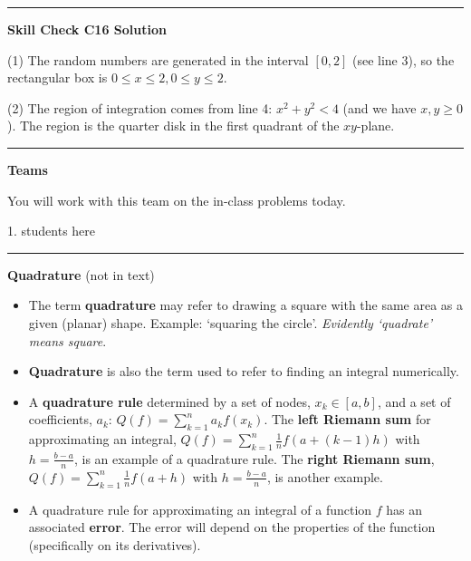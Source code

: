 \documentclass[12pt,letterpaper,noanswers]{exam}
\begin{document}
\vspace{0.2cm}
\hrule
\vspace{0.2cm}

\noindent\textbf{Skill Check C16 Solution}

(1) The random numbers are generated in the interval $[0,2]$ (see line 3), so the rectangular box is $0\leq x \leq 2, 0\leq y \leq 2$.

(2) The region of integration comes from line 4: $x^2+y^2 < 4$ (and we have $x,y\geq 0$).  The region is the quarter disk in the first quadrant of the $xy$-plane.

\vspace{0.2cm}
\hrule
\vspace{0.2cm}

\noindent\textbf{Teams}

You will work with this team on the in-class problems today.
\begin{multicols}{2}
1.  students here

\end{multicols}

\hrule
\vspace{0.2cm}





\noindent\textbf{Quadrature} (not in text)
\begin{tcolorbox}
\begin{itemize}
\itemsep0em
    \item The term \textbf{quadrature} may refer to drawing a square with the same area as a given (planar) shape.  Example: `squaring the circle'.  \emph{Evidently `quadrate' means square}.
    \item \textbf{Quadrature} is also the term used to refer to finding an integral numerically.
    \item A \textbf{quadrature rule} determined by a set of nodes, $x_k \in [a,b]$, and a set of coefficients, $a_k$: $\displaystyle Q(f) = \sum\limits_{k=1}^n a_k f(x_k)$.  The \textbf{left Riemann sum} for approximating an integral, $\displaystyle Q(f) = \sum\limits_{k=1}^n \frac{1}{n}f(a + (k-1)h)$ with $h = \frac{b-a}{n}$,  is an example of a quadrature rule.  The \textbf{right Riemann sum}, $\displaystyle Q(f) = \sum\limits_{k=1}^n \frac{1}{n}f(a + h)$ with $h = \frac{b-a}{n}$, is another example.
    \item A quadrature rule for approximating an integral of a function $f$ has an associated \textbf{error}.  The error will depend on the properties of the function (specifically on its derivatives).
\end{itemize}
\end{tcolorbox}
\end{document}
